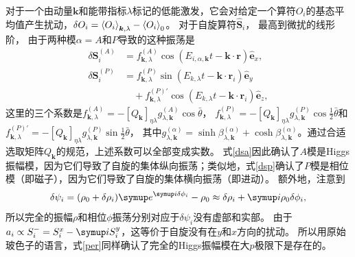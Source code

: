 对于一个由动量$\bm{k}$和能带指标$\lambda$标记的低能激发，它会对给定一个算符$O_i$的基态平均值产生扰动，$\delta O_i = \expval{O_i}_{\bm k,\lambda}-\expval{O_i}_0$。
对于自旋算符$\hat{\bm{S}}_i$，
最高到微扰的线形阶，
由于两种模$\alpha = A$和$P$导致的这种振荡是
\begin{subequations}\label{per}
    \begin{align}
        \delta \bm{S}_i^{(A)} &= f^{(A)}_{\bm{k}, \lambda} \cos (E_{i, \alpha,
  \bm{k}} t -\bm{k} \cdot \bm{r}) \hat{\bm{e}}_x,
  \label{dsa}\\
   \delta \bm{S}_i^{(P)} &= f^{(P)}_{ \bm{k}, \lambda} \sin (E_{k,
  \lambda} t -\bm{k} \cdot \bm{r}_i) \hat{\bm{e}}_y \nonumber\\
 &\quad + f^{(P)\prime}_{\bm{k}, \lambda} \cos (E_{k, \lambda} t -\bm{k} \cdot
  \bm{r}_i) \hat{\bm{e}}_z, \label{dsp}
    \end{align}
\end{subequations}
这里的三个系数是$f^{(A)}_{\bm{k}, \lambda} = - [Q_{\bm{k}}]_{\eta \lambda} g^{(A)}_{\lambda, \bm{k}} \cos \bar{\theta}$，
$f^{(P)}_{\bm{k}, \lambda}= - [Q_{\bm{k}}]_{\eta \lambda} g^{(P)}_{\lambda, \bm{k}} \cos\frac{1}{2}\bar{\theta}$和$f^{(P)\prime}_{\bm{k}, \lambda} = -[Q_{\bm{k}}]_{\eta \lambda} g^{(P)}_{\lambda, \bm{k}} \sin\frac{1}{2}\bar{\theta}$，
其中$g^{(\alpha)}_{\lambda, \bm{k}} = \sinh\beta^{(\alpha)}_{\lambda, \bm{k}} + \cosh \beta^{(\alpha)}_{\lambda,
\bm{k}}$。通过合适选取矩阵$Q_{\bm{k}}$的规范，上述系数可以全部变成实数。
式\eqref{dsa}因此确认了$A$模是Higgs振幅模，因为它们导致了自旋的集体纵向振荡；类似地，式\eqref{dsp}确认了$P$模是相位模（即磁子），因为它们导致了自旋的集体横向振荡（即进动）。
额外地，注意到
\begin{equation}
  \delta\psi_i = (\rho_0 + \delta \rho_i) \eu^{\iu \delta \phi_i} - \rho_0
  \approx \delta \rho_i + \iu \rho_0 \delta \phi_i, \label{op}
\end{equation}
所以完全的振幅$\rho$和相位$\phi$振荡分别对应于$\delta \psi_i$没有虚部和实部。
由于$a_i \propto S_i^- = S_i^x - \iu S_i^y$，这等价于自旋没有在$y$和$x$方向的扰动。
所以用原始玻色子的语言，式\eqref{per}同样确认了完全的Higgs振幅模在大$p$极限下是存在的。

